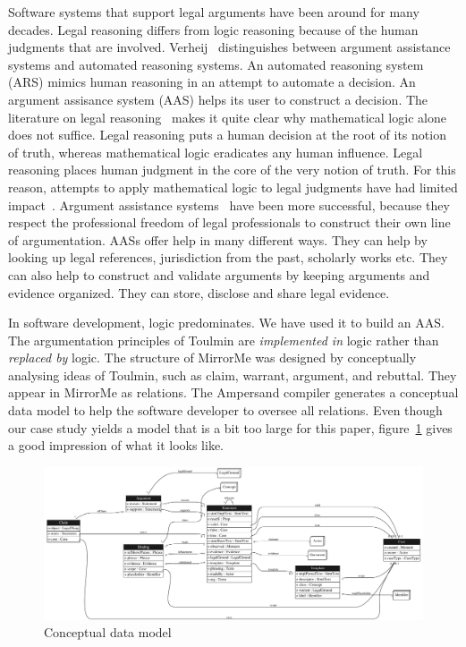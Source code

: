 \documentclass{svproc}
\begin{document}
	Software systems that support legal arguments have been around for many decades.
	Legal reasoning differs from logic reasoning because of the human judgments that are involved.
	Verheij~\cite{Verheij2003} distinguishes between argument assistance systems and automated reasoning systems.
	An automated reasoning system (ARS) mimics human reasoning in an attempt to automate a decision.
	An argument assisance system (AAS) helps its user to construct a decision.
	The literature on legal reasoning~\cite{Lind2007} makes it quite clear why mathematical logic alone does not suffice.
	Legal reasoning puts a human decision at the root of its notion of truth,
	whereas mathematical logic eradicates any human influence.
	Legal reasoning places human judgment in the core of the very notion of truth.
	For this reason, attempts to apply mathematical logic to legal judgments have had limited impact~\cite{Prakken2005}.
	Argument assistance systems~\cite{Verheij2005} have been more successful,
	because they respect the professional freedom of legal professionals to construct their own line of argumentation.
	AASs offer help in many different ways.
	They can help by looking up legal references, jurisdiction from the past, scholarly works etc.
	They can also help to construct and validate arguments by keeping arguments and evidence organized.
	They can store, disclose and share legal evidence.

	In software development, logic predominates.
	We have used it to build an AAS.
	The argumentation principles of Toulmin are \emph{implemented in} logic rather than \emph{replaced by} logic.
	The structure of MirrorMe was designed by conceptually analysing ideas of Toulmin,
	such as claim, warrant, argument, and rebuttal. They appear in MirrorMe as relations.
	The Ampersand compiler generates a conceptual data model
	to help the software developer to oversee all relations.
	Even though our case study yields a model that is a bit too large for this paper,
	figure~\ref{fig:conceptual model} gives a good impression of what it looks like.
\begin{figure}[htb]
\begin{center}
  \includegraphics[scale=.23]{LogicalDataModel.pdf}
\end{center}
\caption{Conceptual data model}
\label{fig:conceptual model}
\end{figure}
	
\end{document}
